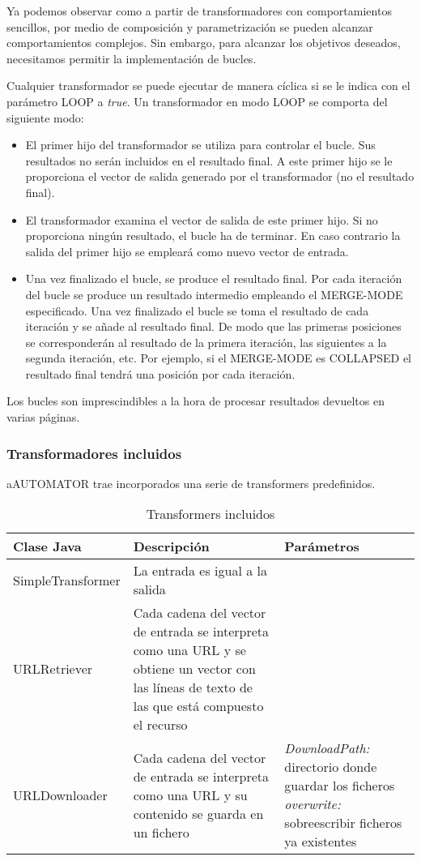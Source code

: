 Ya podemos observar como a partir de transformadores con
comportamientos sencillos, por medio de composición y parametrización
se pueden alcanzar comportamientos complejos. Sin embargo, para
alcanzar los objetivos deseados, necesitamos permitir la
implementación de bucles.

Cualquier transformador se puede ejecutar de manera cíclica si se le
indica con el parámetro LOOP a \emph{true}. Un transformador en modo
LOOP se comporta del siguiente modo:

\begin{itemize}
  \item El primer hijo del transformador se utiliza para controlar el
    bucle. Sus resultados no serán incluidos en el resultado final. A
    este primer hijo se le proporciona el vector de salida generado
    por el transformador (no el resultado final).
  \item El transformador examina el vector de salida de este primer
    hijo. Si no proporciona ningún resultado, el bucle ha de
    terminar. En caso contrario la salida del primer hijo se empleará
    como nuevo vector de entrada.
  \item Una vez finalizado el bucle, se produce el resultado
    final. Por cada iteración del bucle se produce un resultado
    intermedio empleando el MERGE-MODE especificado. Una vez
    finalizado el bucle se toma el resultado de cada iteración y se
    añade al resultado final. De modo que las primeras posiciones se
    corresponderán al resultado de la primera iteración, las
    siguientes a la segunda iteración, etc. Por ejemplo, si el
    MERGE-MODE es COLLAPSED el resultado final tendrá una posición por
    cada iteración.
\end{itemize}

Los bucles son imprescindibles a la hora de procesar resultados
devueltos en varias páginas.

\subsubsection{Transformadores incluidos}

aAUTOMATOR trae incorporados una serie de transformers predefinidos.
\begin{table}[!hbp]
\small{
\begin{tabular}{l p{6cm} p{5cm}}
Clase Java & Descripción & Parámetros \\ \hline

SimpleTransformer & La entrada es igual a la salida & \\ \hline
URLRetriever & Cada cadena del vector de entrada se interpreta como
una URL y se obtiene un vector con las líneas de texto de las que está
compuesto el recurso & \\ \hline
URLDownloader & Cada cadena del vector de entrada se interpreta como
una URL y su contenido se guarda en un fichero & \emph{DownloadPath:}
directorio donde guardar los ficheros \linebreak[4] \emph{overwrite:}
sobreescribir ficheros ya existentes \\ \hline
\end{tabular}
}
\caption{Transformers incluidos}
\end{table}
